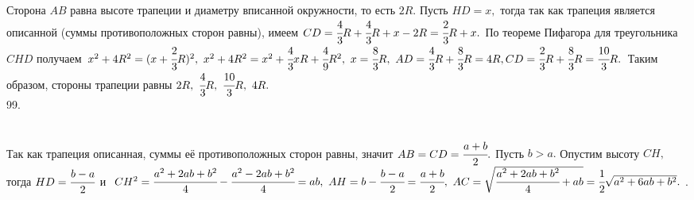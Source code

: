 \documentclass[12pt]{article}
\begin{document}
Сторона $AB$ равна высоте трапеции и диаметру вписанной окружности, то есть $2R.$ Пусть $HD=x,$ тогда так как трапеция является описанной (суммы противоположных сторон равны), имеем $CD=\cfrac{4}{3}R+\cfrac{4}{3}R+x-2R=\cfrac{2}{3}R+x.$ По теореме Пифагора для треугольника $CHD$ получаем $x^2+4R^2=(x+\cfrac{2}{3}R)^2,\
x^2+4R^2=x^2+\cfrac{4}{3}xR+\cfrac{4}{9}R^2,\ x=\cfrac{8}{3}R,\ AD=\cfrac{4}{3}R+\cfrac{8}{3}R=4R, CD=\cfrac{2}{3}R+\cfrac{8}{3}R=\cfrac{10}{3}R.$ Таким образом,
стороны трапеции равны $2R,\ \cfrac{4}{3}R,\ \cfrac{10}{3}R,\ 4R.$\\
99. \begin{figure}[ht!]
\end{figure}\\
Так как трапеция описанная, суммы её противоположных сторон равны, значит $AB=CD=\cfrac{a+b}{2}.$ Пусть $b>a.$ Опустим высоту $CH,$ тогда $HD=\cfrac{b-a}{2}$ и $CH^2=\cfrac{a^2+2ab+b^2}{4}-\cfrac{a^2-2ab+b^2}{4}=ab,\ AH=b-\cfrac{b-a}{2}=\cfrac{a+b}{2},\ AC=\sqrt{\cfrac{a^2+2ab+b^2}{4}+ab}=\cfrac{1}{2}\sqrt{a^2+6ab+b^2}.$\newpage\noindent
100. \begin{figure}[ht!]
\end{figure}\\
\end{document}
